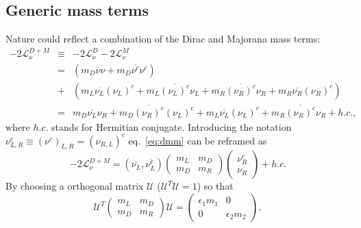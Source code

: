 \subsection{Generic mass terms}
\label{sec:genma}
Nature could reflect a combination of the Dirac and Majorana mass terms:
\begin{equation}
  \label{eq:dmm}
  \begin{array}{ccl}
    -2\mathcal{L}_{\nu}^{D+M} &\equiv& -2\mathcal{L}_{\nu}^{D}             -2\mathcal{L}_{\nu}^{M}\\ &=& \displaystyle{( 
      m_{D}\overline{\nu}\nu +
      m_{D}\overline{\nu^{c}}\nu^{c} )}\\ &+& \displaystyle{(             m_{L}\overline{\nu_{L}}(\nu_{L})^{c} +                         m_{L}\overline{(\nu_{L})^{c}}\nu_{L} +                   m_{R}\overline{(\nu_{R})^{c}}\nu_{R} +                                      m_{R}\overline{\nu_{R}}(\nu_{R})^{c})}\\ &=&\displaystyle{
      m_{D}\overline{\nu_{L}}\nu_{R} +
      m_{D}\overline{(\nu_{R})^{c}}(\nu_{L})^{c} +
      m_{L}\overline{\nu_{L}}(\nu_{L})^{c} + 
      m_{R}\overline{(\nu_{R})^{c}}\nu_{R} + h.c.},
  \end{array}
\end{equation}
where $h.c.$ stands for Hermitian conjugate. Introducing the notation $\nu^{c}_{L,R} \equiv (\nu^{c})_{L,R} = (\nu_{R,L})^{c}$ eq.~\ref{eq:dmm} can be reframed as
\begin{equation}
  \label{eq:mm}
  -2\mathcal{L}_{\nu}^{D+M} =       \left(\overline{\nu_{L}},\overline{\nu^{c}_{L}}\right)
  \left(\begin{array}{cc}m_L & m_D \\ m_D & m_R\end{array}\right)
  \left(\begin{array}{c}\nu^{c}_R \\ \nu_R\end{array}\right) + h.c.
\end{equation}
By choosing a orthogonal matrix $\mathcal{U}$ ($\mathcal{U}^{T}
\mathcal{U} = 1$) so that
\begin{equation}
  \label{eq:mmat}
  \mathcal{U}^{T}\left(\begin{array}{cc}m_L & m_D \\ m_D &       
m_R\end{array}\right)\mathcal{U} = 
  \left(\begin{array}{cc}\epsilon_{1}m_1 & 0 \\ 0 &            
\epsilon_{2}m_2\end{array}\right),
\end{equation}
